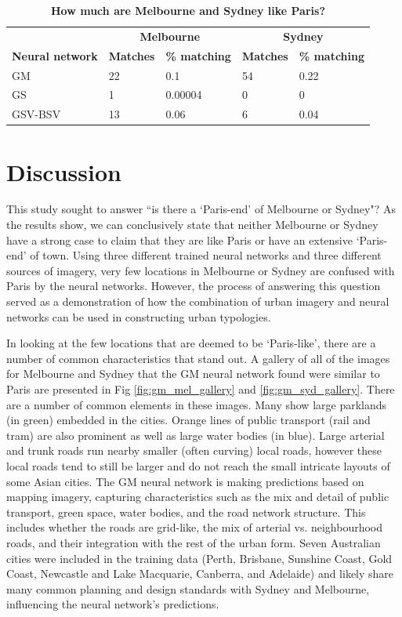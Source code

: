 \documentclass[Crown,sageh,times]{sagej}
\begin{document}
\begin{table}[!htbp]
\caption{\bf How much are Melbourne and Sydney like Paris? \label{tab:melbournesydneyparis}}     
\begin{tabular}{ l  l l l  l}
 \hline    &  \multicolumn{2}{c}{\textbf{Melbourne}} & \multicolumn{2}{c}{\textbf{Sydney}}  \\  
\textbf{Neural network} & \textbf{Matches} & \textbf{\% matching}  & \textbf{Matches} & \textbf{\% matching}\\ \hline
GM & 22 & 0.1 & 54 & 0.22 \\ 
GS & 1 & 0.00004 & 0 & 0 \\ 
GSV-BSV & 13 & 0.06 & 6 & 0.04 \\ \hline
\end{tabular}
\end{table}

\section{Discussion}\label{sec:discussion}
This study sought to answer ``is there a `Paris-end' of Melbourne or Sydney"? As the results show, we can conclusively state that neither Melbourne or Sydney have a strong case to claim that they are like Paris or have an extensive `Paris-end' of town. Using three different trained neural networks and three different sources of imagery, very few locations in Melbourne or Sydney are confused with Paris by the neural networks. However, the process of answering this question served as a demonstration of how the combination of urban imagery and neural networks can be used in constructing urban typologies.

In looking at the few locations that are deemed to be `Paris-like', there are a number of common characteristics that stand out. A gallery of all of the images for Melbourne and Sydney that the GM neural network found were similar to Paris are presented in Fig \ref{fig:gm_mel_gallery} and \ref{fig:gm_syd_gallery}. There are a number of common elements in these images. Many show large parklands (in green) embedded in the cities. Orange lines of public transport (rail and tram) are also prominent as well as large water bodies (in blue). Large arterial and trunk roads run nearby smaller (often curving) local roads, however these local roads tend to still be larger and do not reach the small intricate layouts of some Asian cities. The GM neural network is making predictions based on mapping imagery, capturing characteristics such as the mix and detail of public transport, green space, water bodies, and the road network structure. This includes whether the roads are grid-like, the mix of arterial vs. neighbourhood roads, and their integration with the rest of the urban form. Seven Australian cities were included in the training data (Perth, Brisbane, Sunshine Coast, Gold Coast, Newcastle and Lake Macquarie, Canberra, and Adelaide) and likely share many common planning and design standards with Sydney and Melbourne, influencing the neural network's predictions. 
\end{document}
